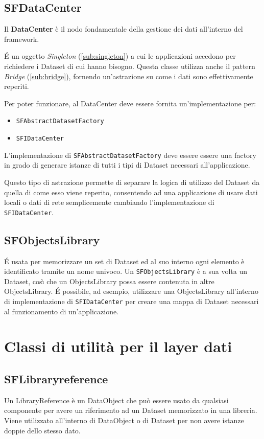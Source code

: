 \subsection{SFDataCenter}
\label{sub:sfdatacenter} 
Il \textbf{DataCenter} \`e il nodo fondamentale della gestione dei dati all'interno del framework. 

\'E un oggetto \textit{Singleton} (\ref{sub:singleton}) a cui le applicazioni accedono per richiedere i Dataset di cui hanno bisogno. Questa classe utilizza anche il pattern \textit{Bridge} (\ref{sub:bridge}), fornendo un'astrazione su come i dati sono effettivamente reperiti.

Per poter funzionare, al DataCenter deve essere fornita un'implementazione per:
\begin{itemize}
	\item \texttt{SFAbstractDatasetFactory}
	\item \texttt{SFIDataCenter}
\end{itemize}

L'implementazione di \texttt{SFAbstractDatasetFactory} deve essere essere una factory in grado di generare istanze di tutti i tipi di Dataset necessari all'applicazione.

Questo tipo di astrazione permette di separare la logica di utilizzo del Dataset da quella di come esso viene reperito, consentendo ad una applicazione di usare dati locali o dati di rete semplicemente cambiando l'implementazione di \texttt{SFIDataCenter}.

\subsection{SFObjectsLibrary}
\label{sub:sfobjectslibrary}
\'E usata per memorizzare un set di Dataset ed al suo interno ogni elemento \`e identificato tramite un nome univoco.
Un \texttt{SFObjectsLibrary} \`e a sua volta un Dataset, cos{\`\i} che un ObjectsLibrary possa essere contenuta in altre ObjectsLibrary.
\'E possibile, ad esempio, utilizzare una ObjectsLibrary all'interno di implementazione di \texttt{SFIDataCenter} per creare una mappa di Dataset necessari al funzionamento di un'applicazione.

\section{Classi di utilit\`a per il layer dati}

\subsection{SFLibraryreference}
\label{sub:sflibraryreference}
Un LibraryReference \`e un DataObject che pu\`o essere usato da qualsiasi componente per avere un riferimento ad un Dataset memorizzato in una libreria. Viene utilizzato all'interno di DataObject o di Dataset per non avere istanze doppie dello stesso dato.

